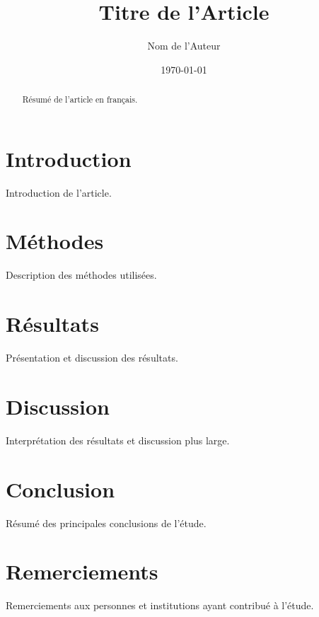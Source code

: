 \documentclass[a4paper,12pt]{article}
\title{Titre de l'Article}
\author{Nom de l'Auteur}
\date{\today}
\begin{document}
\maketitle

\begin{abstract}
Résumé de l'article en français.
\end{abstract}

\section{Introduction}
Introduction de l'article.

\section{Méthodes}
Description des méthodes utilisées.

\section{Résultats}
Présentation et discussion des résultats.

\section{Discussion}
Interprétation des résultats et discussion plus large.

\section{Conclusion}
Résumé des principales conclusions de l'étude.

\section*{Remerciements}
Remerciements aux personnes et institutions ayant contribué à l'étude.



\end{document}
